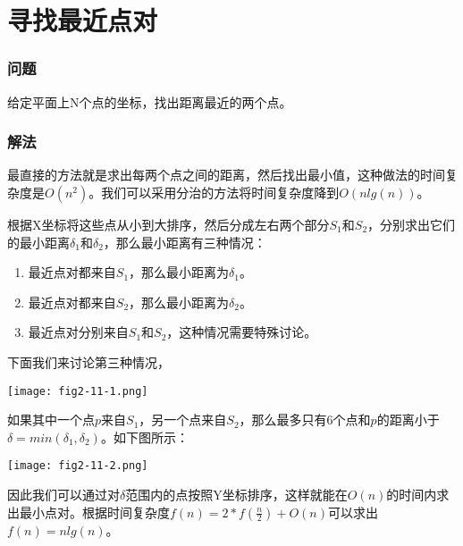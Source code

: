 \section{寻找最近点对} %
\label{sec:closest-pair-of-points}

\subsubsection{问题}
给定平面上N个点的坐标，找出距离最近的两个点。

\subsubsection{解法}
最直接的方法就是求出每两个点之间的距离，然后找出最小值，这种做法的时间复杂度是$O(n^2)$。我们可以采用分治的方法将时间复杂度降到$O(nlg(n))$。

根据X坐标将这些点从小到大排序，然后分成左右两个部分$S_1$和$S_2$，分别求出它们的最小距离$\delta_1$和$\delta_2$，那么最小距离有三种情况：
\begin{enumerate}
	\item 最近点对都来自$S_1$，那么最小距离为$\delta_1$。
	\item 最近点对都来自$S_2$，那么最小距离为$\delta_2$。
	\item 最近点对分别来自$S_1$和$S_2$，这种情况需要特殊讨论。
\end{enumerate}
下面我们来讨论第三种情况，
\begin{center}
	\texttt{[image: fig2-11-1.png]}\\
	\label{fig:closest-pair-of-points-1}
\end{center}
如果其中一个点$p$来自$S_1$，另一个点来自$S_2$，那么最多只有6个点和$p$的距离小于$\delta = min(\delta_1, \delta_2)$。如下图所示：
\begin{center}
	\texttt{[image: fig2-11-2.png]}\\
	\label{fig:closest-pair-of-points-2}
\end{center}
因此我们可以通过对$\delta$范围内的点按照Y坐标排序，这样就能在$O(n)$的时间内求出最小点对。根据时间复杂度$f(n)=2*f(\frac{n}{2})+O(n)$可以求出$f(n)=nlg(n)$。

